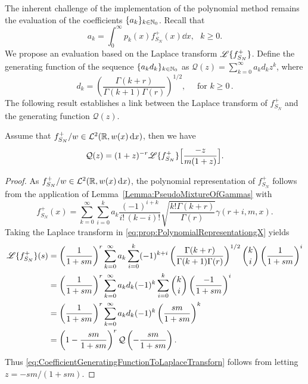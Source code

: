 The inherent challenge of the implementation of the polynomial method remains the evaluation of the coefficients $\{a_k \}_{k \in \mathbb{N}_0}$. Recall that
\begin{equation*}
a_{k}=\int_{0}^{\infty}p_k(x)f_{S_N}^+(x)\dd x,\text{ }k\geq0.
\end{equation*}
We propose an evaluation based on the Laplace transform $\mathscr{L}\{f_{S_N}^+\}$. Define the generating function of the sequence $\{a_k d_k \}_{k \in \mathbb{N}_0}$ as $\mathcal{Q}(z)=\sum_{k=0}^{\infty}a_{k}d_{k}z^{k}$, where
\begin{equation*}\label{eq:ck}
d_k= \left(\frac{\Gamma(k+r)}{\Gamma(k+1)\Gamma(r)}\right)^{1/2}, \quad \text{ for }k\geq0 \,.
\end{equation*}
The following result establishes a link between the Laplace transform of $f_{S_N}^+$  and the generating function $\mathcal{Q}(z)$.
\begin{proposition}\label{prop:LaplaceTransformPolynomialRepresentation}
Assume that $f_{S_N}^+/w\in\mathcal{L}^2(\mathbb{R}, w(x) \mathop{}\!\mathrm{d} x)$, then we have
\begin{equation}\label{eq:CoefficientGeneratingFunctionToLaplaceTransforn}
\mathcal{Q}(z)=(1+z)^{-r}\mathscr{L}\{f_{S_N}^+\}\Big[\frac{-z}{m(1+z)}\Big].
\end{equation}
\end{proposition}
\begin{proof}
As $f_{S_N}^+/w\in\mathcal{L}^2(\mathbb{R}, w(x) \mathop{}\!\mathrm{d} x)$, the polynomial representation of $f_{S_N}^+$ follows from the application of Lemma~\ref{Lemma:PseudoMixtureOfGammas} with
\begin{equation}\label{eq:prop:PolynomialRepresentationgX}
f_{S_N}^+(x)=\sum_{k=0}^{\infty}\sum_{i=0}^{k}a_k\frac{(-1)^{i+k}}{i! \, (k-i)!} \sqrt{\frac{k! \Gamma(k+r)}{\Gamma(r)}}\gamma(r+i,m,x).
\end{equation}
Taking the Laplace transform in \eqref{eq:prop:PolynomialRepresentationgX} yields
\begin{align*}
\mathscr{L}\{f_{S_N}^+\}(s)
&= \left(\frac{1}{1+sm}\right)^{r}\sum_{k=0}^{\infty}a_k \sum_{i=0}^{k} (-1)^{k+i} \left(\frac{\Gamma(k+r)}{\Gamma(k+1)\Gamma(r)}\right)^{1/2} \binom{k}{i} \left(\frac{1}{1+sm}\right)^{i}\nonumber \\
&= \left(\frac{1}{1+sm}\right)^{r}\sum_{k=0}^{\infty}a_k d_k (-1)^{k} \sum_{i=0}^{k} \binom{k}{i} \left(\frac{-1}{1+sm}\right)^{i} \nonumber\\
&= \left(\frac{1}{1+sm}\right)^{r}\sum_{k=0}^{\infty}a_k d_k (-1)^{k} \left( \frac{sm}{1+sm}  \right)^{k}\nonumber \\
&= \left( 1 - \frac{sm}{1+sm}\right)^{r}\mathcal{Q}\left(-\frac{sm}{1+sm}\right).
\end{align*}
Thus \eqref{eq:CoefficientGeneratingFunctionToLaplaceTransforn} follows from letting $z= -sm / (1+sm)$.
\end{proof}
